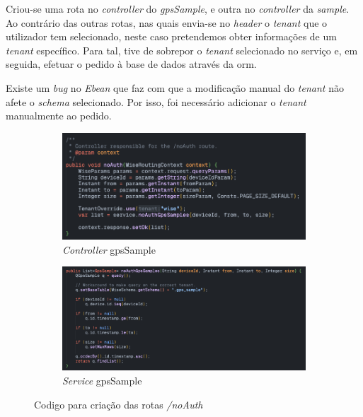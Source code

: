 Criou-se uma rota no \textit{controller} do \textit{gpsSample}, e outra no \textit{controller} da \textit{sample}. Ao contrário das outras rotas, nas quais envia-se no \textit{header} o \textit{tenant} que o utilizador tem selecionado, neste caso pretendemos obter informações de um \textit{tenant} específico. Para tal, tive de sobrepor o \textit{tenant} selecionado no serviço e, em seguida, efetuar o pedido à base de dados através da \acs{orm}.

Existe um \textit{bug} no \textit{Ebean} que faz com que a modificação manual do \textit{tenant} não afete o \textit{schema} selecionado. Por isso, foi necessário adicionar o \textit{tenant} manualmente ao pedido.

\begin{figure}[!h]
	\centering
	\begin{subfigure}[c]{0.45\textwidth}
		\centering
		\includegraphics[width=\textwidth]{figs/gpsSampleController.png}
		\caption{\textit{Controller} gpsSample}
		\label{fig:controllerGpsSample}
	\end{subfigure}
	\hfill
	\begin{subfigure}[c]{0.45\textwidth}
        \centering
        \includegraphics[width=\textwidth]{figs/gpsSampleService.png}
		\caption{\textit{Service} gpsSample}
        \label{fig:serviceGpsSample}
	\end{subfigure}
	\caption{Codigo para criação das rotas \textit{/noAuth}}
\end{figure}

